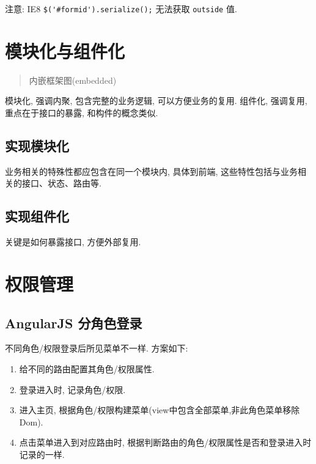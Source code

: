 注意: IE8 \lstinline!$('#formid').serialize();! 无法获取
\lstinline!outside! 值.

\section{模块化与组件化}\label{ux6a21ux5757ux5316ux4e0eux7ec4ux4ef6ux5316}

\begin{quote}
内嵌框架图(embedded)
\end{quote}

模块化, 强调内聚, 包含完整的业务逻辑, 可以方便业务的复用. 组件化,
强调复用, 重点在于接口的暴露, 和构件的概念类似.

\subsection{实现模块化}\label{ux5b9eux73b0ux6a21ux5757ux5316}

业务相关的特殊性都应包含在同一个模块内, 具体到前端,
这些特性包括与业务相关的接口、状态、路由等.

\subsection{实现组件化}\label{ux5b9eux73b0ux7ec4ux4ef6ux5316}

关键是如何暴露接口, 方便外部复用.

\section{权限管理}\label{ux6743ux9650ux7ba1ux7406}

\subsection{AngularJS
分角色登录}\label{angularjs-ux5206ux89d2ux8272ux767bux5f55}

不同角色/权限登录后所见菜单不一样. 方案如下:

\begin{enumerate}
\def\labelenumi{\arabic{enumi}.}
\tightlist
\item
  给不同的路由配置其角色/权限属性.
\item
  登录进入时, 记录角色/权限.
\item
  进入主页, 根据角色/权限构建菜单(view中包含全部菜单,非此角色菜单移除
  Dom).
\item
  点击菜单进入到对应路由时,
  根据判断路由的角色/权限属性是否和登录进入时记录的一样.
\end{enumerate}


